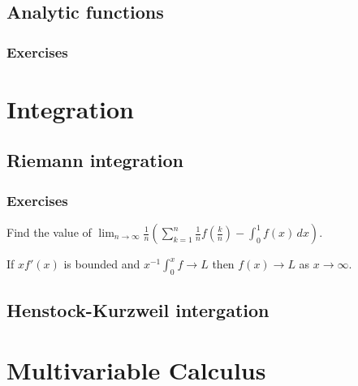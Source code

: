 \documentclass{../note}
\begin{document}
\chapter{Analytic functions}


\section*{Exercises}



\part{Integration}

\chapter{Riemann integration}

\section*{Exercises}
\begin{prb}
Find the value of $\lim_{n\to\infty}\frac1n\left(\sum_{k=1}^n\frac1nf\left(\frac kn\right)-\int_0^1f(x)\,dx\right)$.
\end{prb}

\begin{prb}
If $xf'(x)$ is bounded and $x^{-1}\int_0^xf\to L$ then $f(x)\to L$ as $x\to\infty$.
\end{prb}

\chapter{Henstock-Kurzweil intergation}


\chapter{}


\part{Multivariable Calculus}
\end{document}
